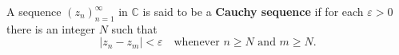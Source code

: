 A sequence $(z_n)_{n=1}^{\infty}$ in $\mathbb{C}$ is said to be a \textbf{Cauchy sequence} if for each $\varepsilon > 0$ there is an integer $N$ such that
$$|z_n - z_m| < \varepsilon \quad \text{whenever } n \geq N \text{ and } m \geq N.$$
